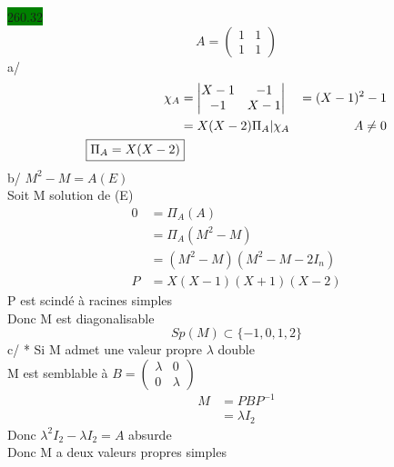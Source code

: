 \documentclass{article}
\begin{document}
\noindent
\colorbox{green}{260.32}\\
\begin{equation*}
    A = \begin{pmatrix}
      1&1\\1&1 
    \end{pmatrix}
\end{equation*}
a/ \begin{align*}
  \chi_A &= \begin{vmatrix}
    X-1 & -1 \\ -1 & X-1
  \end{vmatrix}
         &= (X-1)^{2} - 1\\
         &= X(X-2)
  \Pi_A | \chi_A & A \neq 0\\
  \Aboxed{\Pi_A = X(X-2)}
  \end{align*}
b/ \(M^2 - M = A (E)\)\\
Soit M solution de (E) \begin{align*}
  0 &= \Pi_A (A)\\
    &= \Pi_A (M^2-M)\\
    &= (M^2-M)(M^2 - M - 2I_n)\\
  P &= X(X-1)(X+1)(X-2)
\end{align*}
P est scindé à racines simples\\
Donc M est diagonalisable\\
\begin{equation*}
Sp(M) \subset \{-1, 0, 1, 2\}
\end{equation*}
c/ * Si M admet une valeur propre \(\lambda\) double \\
M est semblable à \(B = \begin{pmatrix}
  \lambda & 0 \\ 0 & \lambda
\end{pmatrix}
\)
\begin{align*}
  M &= PBP^{-1}\\
  &= \lambda I_2
\end{align*}
Donc \(\lambda^2 I_2 - \lambda I_2 = A\) absurde\\
Donc M a deux valeurs propres simples \\
\end{document}
